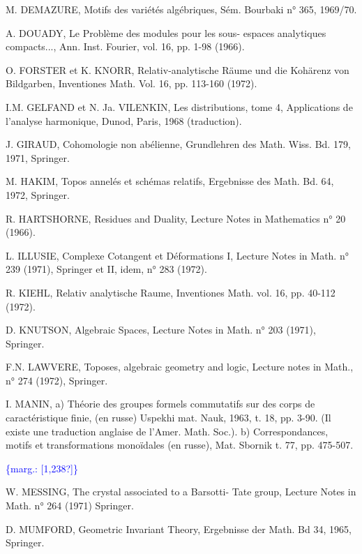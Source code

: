 \documentclass[11pt]{article}
\newcommand{\scanpage}[1]{\par\bigskip\noindent{\small\sffamily[scan #1]}\par}
\newcommand{\mspage}[1]{{\small\sffamily[p.\,#1]}}
\newcommand{\margin}[1]{\textcolor{blue}{\{\textsf{marg.:} #1\}}}
\newcommand{\unsure}[1]{[#1?]}
\begin{document}
M. DEMAZURE, Motifs des variétés algébriques,
Sém. Bourbaki n° 365, 1969/70.

A. DOUADY, Le Problème des modules pour les sous-%
espaces analytiques compacts..., Ann.
Inst. Fourier, vol. 16, pp. 1-98 (1966).

O. FORSTER et K. KNORR, Relativ-analytische Räume
und die Kohärenz von Bildgarben, Inventiones
Math. Vol. 16, pp. 113-160 (1972).

I.M. GELFAND et N. Ja. VILENKIN, Les distributions,
tome 4, Applications de l'analyse harmonique,
Dunod, Paris, 1968 (traduction).

J. GIRAUD, Cohomologie non abélienne, Grundlehren
des Math. Wiss. Bd. 179, 1971, Springer.

M. HAKIM, Topos annelés et schémas relatifs, Ergebnisse
des Math. Bd. 64, 1972, Springer.

R. HARTSHORNE, Residues and Duality, Lecture Notes
in Mathematics n° 20 (1966).

L. ILLUSIE, Complexe Cotangent et Déformations I,
Lecture Notes in Math. n° 239 (1971),
Springer et II, idem, n° 283 (1972).

R. KIEHL, Relativ analytische Raume, Inventiones
Math. vol. 16, pp. 40-112 (1972).

D. KNUTSON, Algebraic Spaces, Lecture Notes in Math.
n° 203 (1971), Springer.

F.N. LAWVERE, Toposes, algebraic geometry and logic,
Lecture notes in Math., n° 274 (1972), Springer.

I. MANIN, a) Théorie des groupes formels commutatifs
sur des corps de caractéristique finie,
(en russe) Uspekhi mat. Nauk, 1963, t. 18,
pp. 3-90. (Il existe une traduction anglaise
de l'Amer. Math. Soc.).
b) Correspondances, motifs et transformations
monoïdales (en russe), Mat. Sbornik t. 77,
pp. 475-507.

\margin{\unsure{1,238}}

\clearpage
\scanpage{119/239}
\mspage{- 27 -}

W. MESSING, The crystal associated to a Barsotti-%
Tate group, Lecture Notes in Math.
n° 264 (1971) Springer.

D. MUMFORD, Geometric Invariant Theory, Ergebnisse
der Math. Bd 34, 1965, Springer.
\end{document}
